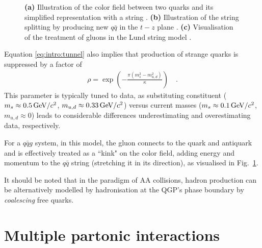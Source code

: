 \begin{figure}[H]
\caption{\textbf{(a)} Illustration of the color field between two quarks and its simplified representation with a string  \cite{ferreres-soleSpaceTimeStructureHadronization2018}. \textbf{(b)} Illustration of the string splitting by producing new $q\bar{q}$ in the $t-z$ plane \cite{ferreres-soleSpaceTimeStructureHadronization2018}. \textbf{(c)} Visualisation of the treatment of gluons in the Lund string model \cite{sjostrandQCDBSMPYTHIA2011}.}
\label{fig:intro:lundstring}
\end{figure}

Equation \ref{eq:intro:tunnel} also implies that production of strange quarks is suppressed by a factor of 
\begin{align}\label{eq:intro:rho}
\rho = \exp \left( -\frac{\pi (m^2_s - m^2_{u,d})}{\kappa} \right) \quad .
\end{align}
This parameter is typically tuned to data, as substituting constituent ($m_s \approx 0.5 \text{\,GeV/$c^2$}$, $m_{u,d} \approx 0.33 \text{\,GeV/$c^2$}$) versus current masses ($m_s \approx 0.1 \text{\,GeV/$c^2$}$, $m_{u,d} \approx 0$) leads to considerable differences underestimating and overestimating data, respectively.

For a $q\bar{q}g$ system, in this model, the gluon connects to the quark and antiquark and is effectively treated as a ``kink" on the color field, adding energy and momentum to the $q\bar{q}$ string (stretching it in its direction), as visualised in Fig.~\ref{fig:intro:lundstring}.

It should be noted that in the paradigm of AA collisions, hadron production can be alternatively modelled by hadronisation at the QGP's phase boundary by \textit{coalescing} free quarks.


\section{Multiple partonic interactions}

